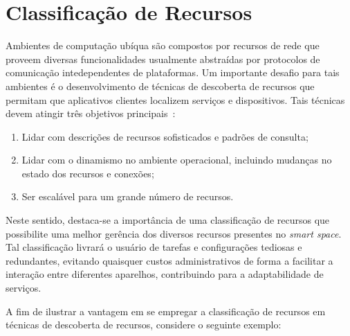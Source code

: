 \chapter{Classificação de Recursos}

Ambientes de computação ubíqua são compostos por recursos de rede que proveem diversas funcionalidades usualmente abstraídas por protocolos de comunicação intedependentes de plataformas. Um importante desafio para tais ambientes é o desenvolvimento de técnicas de descoberta de recursos que permitam que aplicativos clientes localizem serviços e dispositivos. Tais técnicas devem atingir três objetivos principais~\cite{balazinska2002ins/twine}:

\begin{enumerate}
	\item Lidar com descrições de recursos sofisticados e padrões de consulta;
	\item Lidar com o dinamismo no ambiente operacional, incluindo mudanças no estado dos recursos e conexões;
	\item Ser escalável para um grande número de recursos.
\end{enumerate}

Neste sentido, destaca-se a importância de uma classificação de recursos que possibilite uma melhor gerência dos diversos recursos presentes no \emph{smart space}. Tal classificação livrará o usuário de tarefas e configurações tediosas e redundantes, evitando quaisquer custos administrativos de forma a facilitar a interação entre diferentes aparelhos, contribuindo para a adaptabilidade de serviços.

A fim de ilustrar a vantagem em se empregar a classificação de recursos em técnicas de descoberta de recursos, considere o seguinte exemplo:

